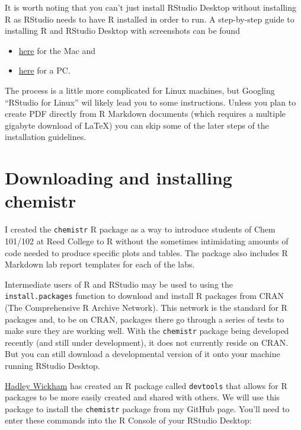 \documentclass[]{tufte-book}
\providecommand{\tightlist}{%
  \setlength{\itemsep}{0pt}\setlength{\parskip}{0pt}}
\begin{document}
It is worth noting that you can't just install RStudio Desktop without
installing R as RStudio needs to have R installed in order to run. A
step-by-step guide to installing R and RStudio Desktop with screenshots
can be found

\begin{itemize}
\tightlist
\item
  \href{http://www.reed.edu/data-at-reed/software/R/r_studio.html}{here}
  for the Mac and
\item
  \href{http://www.reed.edu/data-at-reed/software/R/r_studio_pc.html}{here}
  for a PC.
\end{itemize}

The process is a little more complicated for Linux machines, but
Googling ``RStudio for Linux'' wil likely lead you to some instructions.
Unless you plan to create PDF directly from R Markdown documents (which
requires a multiple gigabyte download of LaTeX) you can skip some of the
later steps of the installation guidelines.

\section{Downloading and installing
chemistr}\label{downloading-and-installing-chemistr}

I created the \texttt{chemistr} R package as a way to introduce students
of Chem 101/102 at Reed College to R without the sometimes intimidating
amounts of code needed to produce specific plots and tables. The package
also includes R Markdown lab report templates for each of the labs.

Intermediate users of R and RStudio may be used to using the
\texttt{install.packages} function to download and install R packages
from CRAN (The Comprehensive R Archive Network). This network is the
standard for R packages and, to be on CRAN, packages there go through a
series of tests to make sure they are working well. With the
\texttt{chemistr} package being developed recently (and still under
development), it does not currently reside on CRAN. But you can still
download a developmental version of it onto your machine running RStudio
Desktop.

\href{http://hadley.nz/}{Hadley Wickham} has created an R package called
\texttt{devtools} that allows for R packages to be more easily created
and shared with others. We will use this package to install the
\texttt{chemistr} package from my GitHub page. You'll need to enter
these commands into the R Console of your RStudio Desktop:
\end{document}
